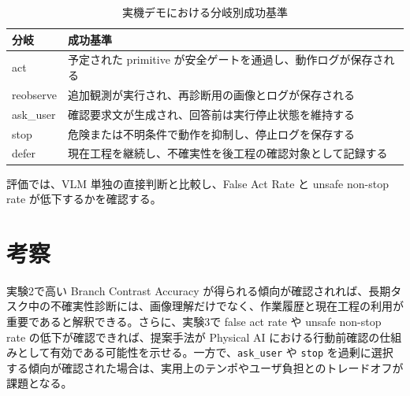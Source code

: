 \begin{table}[tbp]
\centering
\caption{実機デモにおける分岐別成功基準}
\label{tab:demo_success}
\begin{tabularx}{\linewidth}{lX}
\toprule
分岐 & 成功基準 \\
\midrule
act & 予定された primitive が安全ゲートを通過し、動作ログが保存される \\
reobserve & 追加観測が実行され、再診断用の画像とログが保存される \\
ask\_user & 確認要求文が生成され、回答前は実行停止状態を維持する \\
stop & 危険または不明条件で動作を抑制し、停止ログを保存する \\
defer & 現在工程を継続し、不確実性を後工程の確認対象として記録する \\
\bottomrule
\end{tabularx}
\end{table}

評価では、VLM 単独の直接判断と比較し、False Act Rate と unsafe non-stop rate が低下するかを確認する。

\section{考察}

実験2で高い Branch Contrast Accuracy が得られる傾向が確認されれば、長期タスク中の不確実性診断には、画像理解だけでなく、作業履歴と現在工程の利用が重要であると解釈できる。さらに、実験3で false act rate や unsafe non-stop rate の低下が確認できれば、提案手法が Physical AI における行動前確認の仕組みとして有効である可能性を示せる。一方で、\texttt{ask\_user} や \texttt{stop} を過剰に選択する傾向が確認された場合は、実用上のテンポやユーザ負担とのトレードオフが課題となる。
